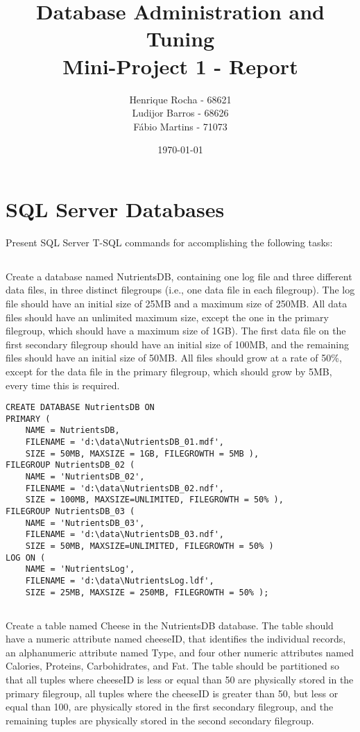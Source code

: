 \documentclass[11pt,report]{article}
\title{	Database Administration and Tuning \\ Mini-Project 1 - Report}
\author{
	Henrique Rocha - 68621 \\
	Ludijor Barros - 68626 \\
	Fábio Martins - 71073
}
\date{\today}
\begin{document}
	\maketitle
\section{SQL Server Databases}
	{\color{gray}Present SQL Server T-SQL commands for accomplishing the following tasks:}
	\subsection{}
	{\color{gray}Create a database named NutrientsDB, containing one log file and three different data files, in three distinct filegroups (i.e., one data file in each filegroup). The log file should have an initial size of 25MB and a maximum size of 250MB. All data files should have an unlimited maximum size, except the one in the primary filegroup, which should have a maximum size of 1GB). The first data file on the first secondary filegroup should have an initial size of 100MB, and the remaining files should have an initial size of 50MB. All files should grow at a rate of 50\%, except for the data file in the primary filegroup, which should grow by 5MB, every time this is required.}

\begin{lstlisting}
CREATE DATABASE NutrientsDB ON 
PRIMARY (
	NAME = NutrientsDB,
	FILENAME = 'd:\data\NutrientsDB_01.mdf',
	SIZE = 50MB, MAXSIZE = 1GB, FILEGROWTH = 5MB ),
FILEGROUP NutrientsDB_02 (
	NAME = 'NutrientsDB_02', 
	FILENAME = 'd:\data\NutrientsDB_02.ndf', 
	SIZE = 100MB, MAXSIZE=UNLIMITED, FILEGROWTH = 50% ),
FILEGROUP NutrientsDB_03 (
	NAME = 'NutrientsDB_03', 
	FILENAME = 'd:\data\NutrientsDB_03.ndf', 
	SIZE = 50MB, MAXSIZE=UNLIMITED, FILEGROWTH = 50% )
LOG ON (
	NAME = 'NutrientsLog',
	FILENAME = 'd:\data\NutrientsLog.ldf',
	SIZE = 25MB, MAXSIZE = 250MB, FILEGROWTH = 50% );
\end{lstlisting}

	\subsection{}
	{\color{gray}Create a table named Cheese in the NutrientsDB database. The table should have a numeric attribute named cheeseID, that identifies the individual records, an alphanumeric attribute named Type, and four other numeric attributes named Calories, Proteins, Carbohidrates, and Fat. The table should be partitioned so that all tuples where cheeseID is less or equal than 50 are physically stored in the primary filegroup, all tuples where the cheeseID is greater than 50, but less or equal than 100, are physically stored in the first secondary filegroup, and the remaining tuples are physically stored in the second secondary filegroup.}
\end{document}
